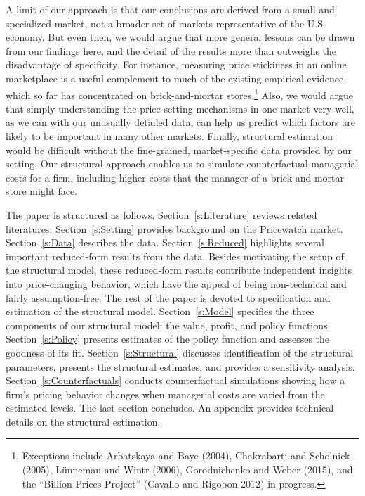 \documentclass[11pt]{article}
\begin{document}
\begin{spacing}{1.3}
A limit of our approach is that our conclusions are derived from a
small and specialized market, not a broader set of markets
representative of the U.S. economy.  But even then, we would argue
that more general lessons can be drawn from our findings here, and the
detail of the results more than outweighs the disadvantage of
specificity.  For instance, measuring price stickiness in an online
marketplace is a useful complement to much of the existing empirical
evidence, which so far has concentrated on brick-and-mortar
stores.\footnote{Exceptions include Arbatskaya and Baye (2004),
  Chakrabarti and Scholnick (2005), L\"unneman and Wintr (2006),
  Gorodnichenko and Weber (2015), and the ``Billion Prices Project''
  (Cavallo and Rigobon 2012) in progress.}  Also, we would argue that
simply understanding the price-setting mechanisms in one market very
well, as we can with our unusually detailed data, can help us predict
which factors are likely to be important in many other
markets. Finally, structural estimation would be difficult without the
fine-grained, market-specific data provided by our setting. Our
structural approach enables us to simulate counterfactual managerial
costs for a firm, including higher costs that the manager of a
brick-and-mortar store might face.

The paper is structured as follows. Section~\ref{s:Literature} reviews
related literatures. Section~\ref{s:Setting} provides background on
the Pricewatch market. Section~\ref{s:Data} describes the
data. Section~\ref{s:Reduced} highlights several important
reduced-form results from the data. Besides motivating the setup of
the structural model, these reduced-form results contribute
independent insights into price-changing behavior, which have the
appeal of being non-technical and fairly assumption-free.  The rest of
the paper is devoted to specification and estimation of the structural
model. Section~\ref{s:Model} specifies the three components of our
structural model: the value, profit, and policy
functions. Section~\ref{s:Policy} presents estimates of the policy
function and assesses the goodness of its
fit. Section~\ref{s:Structural} discusses identification of the
structural parameters, presents the structural estimates, and provides
a sensitivity analysis.  Section~\ref{s:Counterfactuals} conducts
counterfactual simulations showing how a firm's pricing behavior
changes when managerial costs are varied from the estimated
levels. The last section concludes. An appendix provides technical
details on the structural estimation.


\end{spacing}
\end{document}
